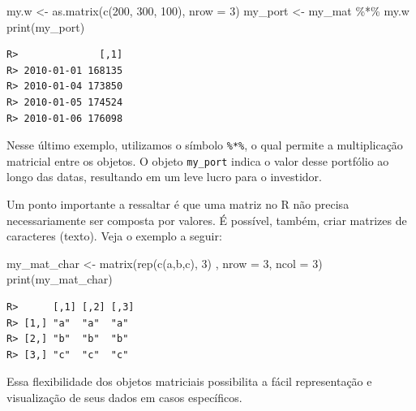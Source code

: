 \documentclass[
  11pt,
]{book}
\newenvironment{Shaded}{\begin{snugshade}}{\end{snugshade}}
\newcommand{\AttributeTok}[1]{\textcolor[rgb]{0.61,0.61,0.61}{#1}}
\newcommand{\DecValTok}[1]{\textcolor[rgb]{0.06,0.06,0.06}{#1}}
\newcommand{\FunctionTok}[1]{\textcolor[rgb]{0,0,0}{#1}}
\newcommand{\NormalTok}[1]{#1}
\newcommand{\OtherTok}[1]{\textcolor[rgb]{0.37,0.37,0.37}{#1}}
\newcommand{\SpecialCharTok}[1]{\textcolor[rgb]{0,0,0}{#1}}
\newcommand{\StringTok}[1]{\textcolor[rgb]{0.5,0.5,0.5}{#1}}
\begin{document}
\begin{Shaded}
\begin{Highlighting}[]
\NormalTok{my.w }\OtherTok{\textless{}{-}} \FunctionTok{as.matrix}\NormalTok{(}\FunctionTok{c}\NormalTok{(}\DecValTok{200}\NormalTok{, }\DecValTok{300}\NormalTok{, }\DecValTok{100}\NormalTok{), }\AttributeTok{nrow =} \DecValTok{3}\NormalTok{)}
\NormalTok{my\_port }\OtherTok{\textless{}{-}}\NormalTok{ my\_mat }\SpecialCharTok{\%*\%}\NormalTok{ my.w}
\FunctionTok{print}\NormalTok{(my\_port)}
\end{Highlighting}
\end{Shaded}

\begin{verbatim}
R>              [,1]
R> 2010-01-01 168135
R> 2010-01-04 173850
R> 2010-01-05 174524
R> 2010-01-06 176098
\end{verbatim}

Nesse último exemplo, utilizamos o símbolo \texttt{\%*\%}, o qual permite a multiplicação matricial entre os objetos. O objeto \texttt{my\_port} indica o valor desse portfólio ao longo das datas, resultando em um leve lucro para o investidor.

Um ponto importante a ressaltar é que uma matriz no R não precisa necessariamente ser composta por valores. É possível, também, criar matrizes de caracteres (texto). Veja o exemplo a seguir:

\begin{Shaded}
\begin{Highlighting}[]
\NormalTok{my\_mat\_char }\OtherTok{\textless{}{-}} \FunctionTok{matrix}\NormalTok{(}\FunctionTok{rep}\NormalTok{(}\FunctionTok{c}\NormalTok{(}\StringTok{\textquotesingle{}a\textquotesingle{}}\NormalTok{,}\StringTok{\textquotesingle{}b\textquotesingle{}}\NormalTok{,}\StringTok{\textquotesingle{}c\textquotesingle{}}\NormalTok{), }\DecValTok{3}\NormalTok{) ,}
                      \AttributeTok{nrow =} \DecValTok{3}\NormalTok{,}
                      \AttributeTok{ncol =} \DecValTok{3}\NormalTok{)}
\FunctionTok{print}\NormalTok{(my\_mat\_char)}
\end{Highlighting}
\end{Shaded}

\begin{verbatim}
R>      [,1] [,2] [,3]
R> [1,] "a"  "a"  "a" 
R> [2,] "b"  "b"  "b" 
R> [3,] "c"  "c"  "c"
\end{verbatim}

Essa flexibilidade dos objetos matriciais possibilita a fácil representação e visualização de seus dados em casos específicos.
\end{document}
